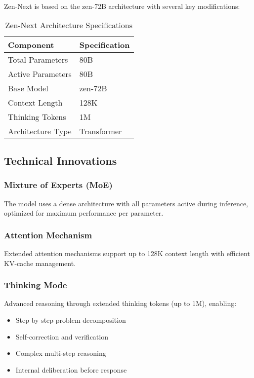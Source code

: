 \documentclass[11pt,a4paper]{article}
\begin{document}
Zen-Next is based on the zen-72B architecture with several key modifications:

\begin{table}[H]
\centering
\begin{tabular}{ll}
\toprule
\textbf{Component} & \textbf{Specification} \\
\midrule
Total Parameters & 80B \\
Active Parameters & 80B \\
Base Model & zen-72B \\
Context Length & 128K \\
Thinking Tokens & 1M \\


Architecture Type & Transformer \\
\bottomrule
\end{tabular}
\caption{Zen-Next Architecture Specifications}
\end{table}

\subsection{Technical Innovations}

\subsubsection{Mixture of Experts (MoE)}
The model uses a dense architecture with all parameters active during inference, optimized for maximum performance per parameter.

\subsubsection{Attention Mechanism}
Extended attention mechanisms support up to 128K context length with efficient KV-cache management.

\subsubsection{Thinking Mode}
Advanced reasoning through extended thinking tokens (up to 1M), enabling:
\begin{itemize}
    \item Step-by-step problem decomposition
    \item Self-correction and verification
    \item Complex multi-step reasoning
    \item Internal deliberation before response
\end{itemize}
\end{document}
